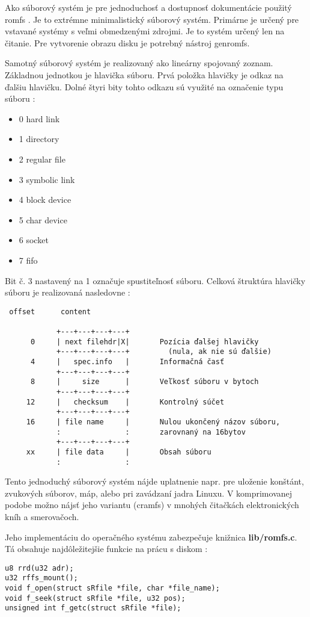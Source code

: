 Ako súborový systém je pre jednoduchosť a dostupnosť dokumentácie použitý romfs \cite{rom_fs}. Je to extrémne minimalistický súborový systém. Primárne je určený pre vstavané systémy s veľmi obmedzenými zdrojmi. Je to systém určený len na čitanie. Pre vytvorenie obrazu disku je potrebný nástroj genromfs. 

Samotný súborový systém je realizovaný ako lineárny spojovaný zoznam. Základnou jednotkou je hlavička súboru. Prvá položka hlavičky je odkaz na ďalšiu hlavičku. Dolné štyri bity tohto odkazu sú využité na označenie typu súboru :

\begin{itemize}      
 \item 0 hard link
 \item 1 directory
 \item 2 regular file
 \item 3 symbolic link
 \item 4 block device
 \item 5 char device
 \item 6 socket
 \item 7 fifo
\end{itemize}

Bit č. 3 nastavený na 1 označuje spustiteľnosť súboru. Celková štruktúra hlavičky súboru je realizovaná nasledovne :
{\small
\begin{verbatim}
 offset      content
 
            +---+---+---+---+
      0     | next filehdr|X|       Pozícia ďalšej hlavičky
            +---+---+---+---+         (nula, ak nie sú ďalšie)
      4     |   spec.info   |       Informačná časť
            +---+---+---+---+
      8     |     size      |       Veľkosť súboru v bytoch
            +---+---+---+---+
     12     |   checksum    |       Kontrolný súčet 
            +---+---+---+---+        
     16     | file name     |       Nulou ukončený názov súboru,
            :               :       zarovnaný na 16bytov
            +---+---+---+---+
     xx     | file data     |       Obsah súboru
            :               :
\end{verbatim}
}

Tento jednoduchý súborový systém nájde uplatnenie napr. pre uloženie konštánt, zvukových súborov, máp, alebo pri zavádzaní jadra Linuxu. V komprimovanej podobe možno nájsť jeho variantu (cramfs) v mnohých čitačkách elektronických kníh a smerovačoch.

Jeho implementáciu do operačného systému zabezpečuje knižnica \textbf{lib/romfs.c}. Tá obsahuje najdôležitejšie funkcie na prácu s diskom :
{\small
\begin{verbatim}
u8 rrd(u32 adr);
u32 rffs_mount();
void f_open(struct sRfile *file, char *file_name);
void f_seek(struct sRfile *file, u32 pos);
unsigned int f_getc(struct sRfile *file);
\end{verbatim}
}

